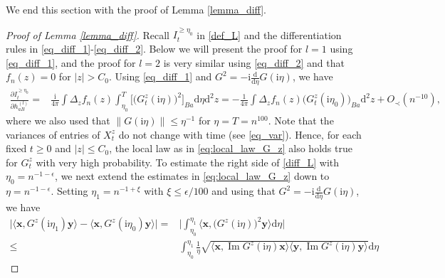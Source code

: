 \documentclass[10pt,reqno]{amsart}
\renewcommand{\Im}{\operatorname{Im}}
\newcommand{\II}{I^{\geq \eta_0}} %
\newcommand{\dd}{\mathrm{d}}
\newcommand{\ii}{\mathrm{i}}
\newcommand{\<}{\langle}
\renewcommand{\>}{\rangle}
\numberwithin{equation}{section}
\begin{document}
We end this section with the proof of Lemma \ref{lemma_diff}.

\begin{proof}[Proof of Lemma \ref{lemma_diff}]

	Recall $\II_t$ in \eqref{def_L} and the differentiation rules in \eqref{eq_diff_1}-\eqref{eq_diff_2}. Below we will present the proof for $l=1$ using \eqref{eq_diff_1}, and the proof for $l=2$ is very similar using \eqref{eq_diff_2} and that $f_n(z)=0$ for $|z|>C_0$. 
Using \eqref{eq_diff_1} and $G^2=-\ii \frac{\dd}{\dd \eta} G(\ii \eta)$, we have
\begin{align}\label{diff_L}
	\frac{\partial \II_t }{\partial h^{(l)}_{aB}}
	=&\frac{\ii}{4\pi} \int \Delta_z f_n(z) \int_{\eta_0}^{T}  \big[ \big(G_t^z(\ii \eta)\big)^2  \big]_{Ba}  \dd \eta \dd^2 z=-\frac{1}{4\pi} \int \Delta_z f_n(z)  \big( G^z_t(\ii \eta_0)\big)_{Ba} \dd^2 z+O_\prec(n^{-10}),
\end{align}
where we also used that $\|G(\ii \eta)\| \leq \eta^{-1}$ for $\eta=T=n^{100}$. Note that the variances of entries of $X^z_t$ do not change with time (see \eqref{eq_var}). Hence, for each fixed $t\geq 0$ and $|z|\leq C_0$, the local law as in \eqref{eq:local_law_G_z} also holds true for $G^z_t$ with very high probability.  To estimate the right side of \eqref{diff_L} with $\eta_0=n^{-1-\epsilon}$, we next extend the estimates in \eqref{eq:local_law_G_z} down to $\eta=n^{-1-\epsilon}$. %
Setting $\eta_1=n^{-1+\xi}$ with $\xi\leq \epsilon/100$ and using that $G^2=-\ii \frac{\dd}{\dd \eta} G(\ii \eta)$, we have
\begin{align}
	\Big|\big\langle \mathbf{x}, G^z(\ii \eta_1)\mathbf{y} \big\rangle-\big\langle \mathbf{x}, G^z(\ii \eta_0)\mathbf{y} \big\rangle\Big|=&\Big|\int_{\eta_0}^{\eta_1} \big\langle \mathbf{x}, \big(G^z(\ii \eta)\big)^2\mathbf{y} \big\rangle \dd \eta \Big|\nonumber\\
	\leq & \int_{\eta_0}^{\eta_1} \frac{1}{\eta}\sqrt{\big\langle \mathbf{x}, \Im G^z(\ii \eta) \mathbf{x} \big\rangle\big\langle \mathbf{y}, \Im G^z(\ii \eta) \mathbf{y} \big\rangle}   \dd \eta

\end{align}
\end{proof}
\end{document}
